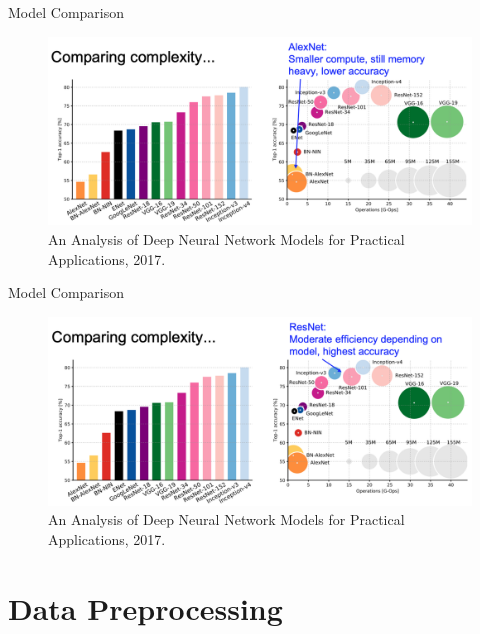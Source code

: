 \documentclass[serif, aspectratio=169]{beamer}
\begin{document}
\begin{frame}{Model Comparison}
	\begin{figure}[htpb]
		\begin{center}
			\includegraphics[keepaspectratio, scale=0.3]{pic/model_comp2}
			\caption*{\scriptsize An Analysis of Deep Neural Network Models for Practical Applications, 2017.}
		\end{center}
	\end{figure}
\end{frame}

\begin{frame}{Model Comparison}
	\begin{figure}[htpb]
		\begin{center}
			\includegraphics[keepaspectratio, scale=0.3]{pic/model_comp3}
			\caption*{\scriptsize An Analysis of Deep Neural Network Models for Practical Applications, 2017.}
		\end{center}
	\end{figure}
\end{frame}

\section{Data Preprocessing}
\end{document}
